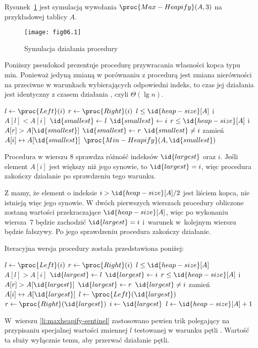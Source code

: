 
\exercise %
Rysunek~\ref{fig:6.2-1} jest symulacją wywołania $\proc{Max-Heapify}(A,3)$ na przykładowej tablicy $A$.
\begin{figure}[ht]
	\begin{center}
		\texttt{[image: fig06.1]}
	\end{center}
	\caption{Symulacja działania procedury } \label{fig:6.2-1}
\end{figure}

\exercise %
Poniższy pseudokod prezentuje procedurę przywracania własności kopca typu min. Ponieważ jedyną zmianą w porównaniu z procedurą  jest zmiana nierówności na przeciwne w warunkach wybierających odpowiedni indeks, to czas jej działania jest identyczny z czasem działania , czyli $\Theta(\lg n)$.
\begin{codebox}
\li	$l\gets\proc{Left}(i)$
\li	$r\gets\proc{Right}(i)$
\li	\If $l\le\id{heap-size}[A]$ i~$A[l]<A[i]$
\li		\Then $\id{smallest}\gets l$
\li		\Else $\id{smallest}\gets i$
		\End
\li	\If $r\le\id{heap-size}[A]$ i $A[r]>A[\id{smallest}]$
\li		\Then $\id{smallest}\gets r$
		\End
\li	\If $\id{smallest}\ne i$
\li		\Then
			zamień $A[i]\leftrightarrow A[\id{smallest}]$
\li			$\proc{Min-Heapify}(A,\id{smallest})$
		\End
\end{codebox}

\exercise %
Procedura w wierszu 8 sprawdza różność indeksów $\id{largest}$ oraz $i$. Jeśli element $A[i]$ jest większy niż jego synowie, to $\id{largest}=i$, więc procedura zakończy działanie po sprawdzeniu tego warunku.

\exercise %
Z  mamy, że element o indeksie $i>\id{heap-size}[A]/2$ jest liściem kopca, nie istnieją więc jego synowie. W dwóch pierwszych wierszach procedury  obliczone zostaną wartości przekraczające $\id{heap-size}[A]$, więc po wykonaniu wiersza~7 będzie zachodzić $\id{largest}=i$ i~warunek w~kolejnym wierszu będzie fałszywy. Po jego sprawdzeniu procedura zakończy działanie.

\exercise %
Iteracyjna wersja procedury  została przedstawiona poniżej:
\begin{codebox}
\li	$l\gets\proc{Left}(i)$
\li	$r\gets\proc{Right}(i)$
\li	\While $l\le\id{heap-size}[A]$
\li		\Do
			\If $A[l]>A[i]$
\li				\Then $\id{largest}\gets l$
\li				\Else $\id{largest}\gets i$
				\End
\li			\If $r\le\id{heap-size}[A]$ i $A[r]>A[\id{largest}]$
\li				\Then $\id{largest}\gets r$
				\End
\li			\If $\id{largest}\ne i$
\li				\Then
					zamień $A[i]\leftrightarrow A[\id{largest}]$
\li					$l\gets\proc{Left}(\id{largest})$
\li					$r\gets\proc{Right}(\id{largest})$
\li					$i\gets\id{largest}$
\li				\Else $l\gets\id{heap-size}[A]+1$ \label{li:maxheapify-sentinel}
				\End
		\End
\end{codebox}
W~wierszu \ref{li:maxheapify-sentinel} zastosowano pewien trik polegający na przypisaniu specjalnej wartości zmiennej $l$ testowanej w warunku pętli . Wartość ta służy wyłącznie temu, aby przerwać działanie pętli.

